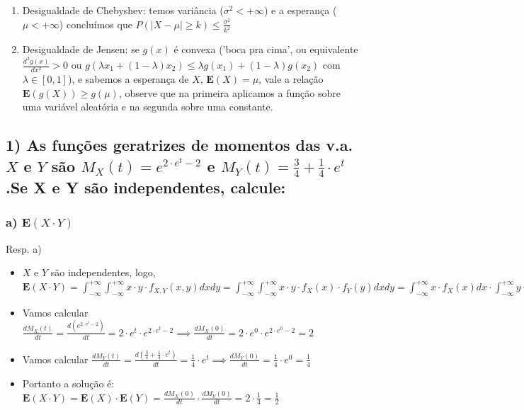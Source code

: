 \documentclass[portuguese]{article}
\begin{document}
\begin{enumerate}
\item Desigualdade de Chebyshev: temos variância ($\sigma^{2}<+\infty$)
e a esperança ($\mu<+\infty$) concluímos que $P(\left|X-\mu\right|\geq k)\le\frac{\sigma^{2}}{k^{2}}$ 

\item Desigualdade de Jensen: se $g(x)$ é convexa ('boca pra cima', ou
equivalente $\frac{d^{2}g(x)}{dx^{2}}>0$ ou $g(\lambda x_{1}+(1-\lambda)x_{2})\le\lambda g(x_{1})+(1-\lambda)g(x_{2})$
com $\lambda\in[0,1]$), e sabemos a esperança de $X$, $\mathbf{E}(X)=\mu$,
vale a relação $\mathbf{E}(g(X))\ge g(\mu)$, observe que na primeira
aplicamos a função sobre uma variável aleatória e na segunda sobre
uma constante.
\end{enumerate}
\pagebreak{}


\subsection*{\textmd{1) As funções geratrizes de momentos das v.a. $X$ e $Y$
são $M_{X}(t)=e^{2\cdot e^{t}-2}$ e $M_{Y}(t)=\frac{3}{4}+\frac{1}{4}\cdot e^{t}$.Se
X e Y são independentes, calcule:}}


\subsubsection*{\textmd{a) $\mathbf{E}(X\cdot Y)$}}

Resp. a)
\begin{itemize}
\item $X$ e $Y$ são independentes, logo, $\mathbf{E}(X\cdot Y)=\int_{-\infty}^{+\infty}\int_{-\infty}^{+\infty}x\cdot y\cdot f_{X,Y}(x,y)dxdy=\int_{-\infty}^{+\infty}\int_{-\infty}^{+\infty}x\cdot y\cdot f_{X}(x)\cdot f_{Y}(y)dxdy=\int_{-\infty}^{+\infty}x\cdot f_{X}(x)dx\cdot\int_{-\infty}^{+\infty}y\cdot f_{Y}(y)dy=\mathbf{E}(X)\cdot\mathbf{E}(Y)=\frac{dM_{X}(0)}{dt}\cdot\frac{dM_{Y}(0)}{dt}$
\item Vamos calcular $\frac{dM_{X}(t)}{dt}=\frac{d(e^{2\cdot e^{t}-2})}{dt}=2\cdot e^{t}\cdot e^{2\cdot e^{t}-2}\implies\frac{dM_{X}(0)}{dt}=2\cdot e^{0}\cdot e^{2\cdot e^{0}-2}=2$
\item Vamos calcular $\frac{dM_{Y}(t)}{dt}=\frac{d(\frac{3}{4}+\frac{1}{4}\cdot e^{t})}{dt}=\frac{1}{4}\cdot e^{t}\implies\frac{dM_{Y}(0)}{dt}=\frac{1}{4}\cdot e^{0}=\frac{1}{4}$
\item Portanto a solução é: $\mathbf{E}(X\cdot Y)=\mathbf{E}(X)\cdot\mathbf{E}(Y)=\frac{dM_{X}(0)}{dt}\cdot\frac{dM_{Y}(0)}{dt}=2\cdot\frac{1}{4}=\frac{1}{2}$
\end{itemize}
\end{document}
